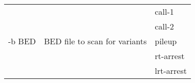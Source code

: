 {\small
\begin{tabular}{@{}p{}p{}l@{}}
\multirow{5}{=}{-b BED} & \multirow{5}{=}{BED file to scan for variants} & call-1 \\
 &  & call-2 \\
 &  & pileup \\
 &  & rt-arrest \\
 &  & lrt-arrest \\
\end{tabular}\\
}
